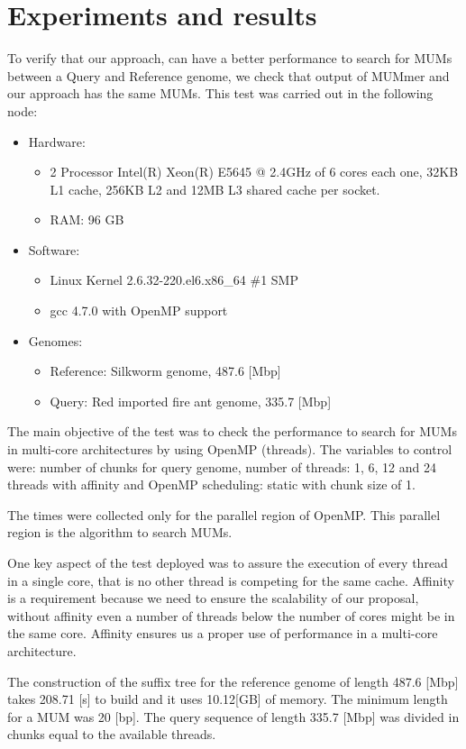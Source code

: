 \documentclass[conference]{IEEEtran}
\begin{document}
\section{Experiments and results}
To verify that our approach, can have a better performance to search for MUMs between a Query and Reference genome, we check that output of MUMmer and our approach has the same MUMs. This test was carried out in the following node:
\begin{itemize}
\item Hardware:  
\begin{itemize}
\item 2 Processor Intel(R) Xeon(R) E5645 @ 2.4GHz of 6 cores each one, 32KB L1 cache, 256KB L2 and 12MB L3 shared cache per socket.
\item RAM: 96 GB
\end{itemize} 
\item  Software: 
\begin{itemize}
\item Linux Kernel 2.6.32-220.el6.x86\_64 \#1 SMP
\item gcc 4.7.0 with OpenMP support
\end{itemize}  
\item Genomes:
  \begin{itemize}
    \item Reference: Silkworm genome, 487.6 [Mbp]
    \item Query: Red imported fire ant genome, 335.7 [Mbp]
  \end{itemize}
\end{itemize}
The main objective of the test was to check the performance to search for MUMs in multi-core architectures by using OpenMP (threads). The variables to control were: number of chunks for query genome, number of threads: 1, 6, 12 and 24 threads with affinity and OpenMP scheduling: static with chunk size of 1.

The times were collected only for the parallel region of OpenMP. This parallel region is the algorithm to search MUMs.

One key aspect of the test deployed was to assure the execution of every thread in a single core, that is no other thread is competing for the same cache. Affinity is a requirement because we need to ensure the scalability of our proposal, without affinity even a number of threads below the number of cores might be in the same core. Affinity ensures us a proper use of performance in a multi-core architecture.

The construction of the suffix tree for the reference genome of length 487.6 [Mbp] takes 208.71 [s] to build and it uses 10.12[GB] of memory. The minimum length for a MUM was 20 [bp]. The query sequence of length 335.7 [Mbp] was divided in chunks equal to the available threads.
\end{document}
